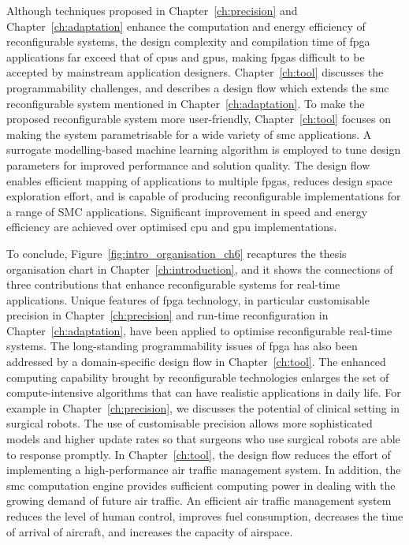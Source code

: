 Although techniques proposed in Chapter~\ref{ch:precision} and Chapter~\ref{ch:adaptation} enhance the computation and energy efficiency of reconfigurable systems,
the design complexity and compilation time of \gls{fpga} applications far exceed that of \glspl{cpu} and \glspl{gpu}, making \glspl{fpga} difficult to be accepted by mainstream application designers.
Chapter~\ref{ch:tool} discusses the programmability challenges, and describes a design flow which extends the \gls{smc} reconfigurable system mentioned in Chapter~\ref{ch:adaptation}.
To make the proposed reconfigurable system more user-friendly, Chapter~\ref{ch:tool} focuses on making the system parametrisable for a wide variety of \gls{smc} applications.
A surrogate modelling-based machine learning algorithm is employed to tune design parameters for improved performance and solution quality. 
The design flow enables efficient mapping of applications to multiple \glspl{fpga}, reduces design space exploration effort, and is capable of producing reconfigurable implementations for a range of SMC applications.
Significant improvement in speed and energy efficiency are achieved over optimised \gls{cpu} and \gls{gpu} implementations.

To conclude, Figure~\ref{fig:intro_organisation_ch6} recaptures the thesis organisation chart in Chapter~\ref{ch:introduction}, and it shows the connections of three contributions that enhance reconfigurable systems for real-time applications.
Unique features of \gls{fpga} technology, in particular customisable precision in Chapter~\ref{ch:precision} and run-time reconfiguration in Chapter~\ref{ch:adaptation}, have been applied to optimise reconfigurable real-time systems.
The long-standing programmability issues of \gls{fpga} has also been addressed by a domain-specific design flow in Chapter~\ref{ch:tool}.
The enhanced computing capability brought by reconfigurable technologies enlarges the set of compute-intensive algorithms that can have realistic applications in daily life.
For example in Chapter~\ref{ch:precision}, we discusses the potential of clinical setting in surgical robots.
The use of customisable precision allows more sophisticated models and higher update rates so that surgeons who use surgical robots are able to response promptly.
In Chapter~\ref{ch:tool}, the design flow reduces the effort of implementing a high-performance air traffic management system.
In addition, the \gls{smc} computation engine provides sufficient computing power in dealing with the growing demand of future air traffic.
An efficient air traffic management system reduces the level of human control, improves fuel consumption, decreases the time of arrival of aircraft, and increases the capacity of airspace.


